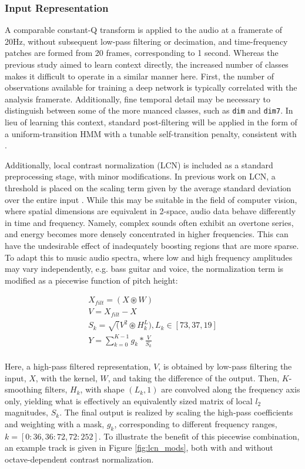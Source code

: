 \subsubsection{Input Representation}
\label{subsubsec:data_considerations}
A comparable constant-Q transform is applied to the audio at a framerate of 20Hz, without subsequent low-pass filtering or decimation, and time-frequency patches are formed from 20 frames, corresponding to 1 second.
Whereas the previous study aimed to learn context directly, the increased number of classes makes it difficult to operate in a similar manner here.
First, the number of observations available for training a deep network is typically correlated with the analysis framerate.
Additionally, fine temporal detail may be necessary to distinguish between some of the more nuanced classes, such as \texttt{dim} and \texttt{dim7}.
In lieu of learning this context, standard post-filtering will be applied in the form of a uniform-transition HMM with a tunable self-transition penalty, consistent with \cite{Cho2014Improved}. %

Additionally, local contrast normalization (LCN) is included as a standard preprocessing stage, with minor modifications.
In previous work on LCN, a threshold is placed on the scaling term given by the average standard deviation over the entire input \cite{Kavukcuoglu2010Learning}.
While this may be suitable in the field of computer vision, where spatial dimensions are equivalent in 2-space, audio data behave differently in time and frequency.
Namely, complex sounds often exhibit an overtone series, and energy becomes more densely concentrated in higher frequencies.
This can have the undesirable effect of inadequately boosting regions that are more sparse.
To adapt this to music audio spectra, where low and high frequency amplitudes may vary independently, e.g. bass guitar and voice, the normalization term is modified as a piecewise function of pitch height:

\begin{align*}
X_{filt} = (X \circledast W) \\
V = X_{filt} - X \\
S_k = \sqrt(V^2 \circledast H_k^L), L_k \in [73, 37, 19] \\
Y = \sum_{k=0}^{K-1} g_k * \frac{V}{S_k} \\
\end{align*}

\noindent Here, a high-pass filtered representation, $V$, is obtained by low-pass filtering the input, $X$, with the kernel, $W$, and taking the difference of the output.
Then, $K$-smoothing filters, $H_k$, with shape $(L_k, 1)$ are convolved along the frequency axis only, yielding what is effectively an equivalently sized matrix of local $l_2$ magnitudes, $S_k$.
The final output is realized by scaling the high-pass coefficients and weighting with a mask, $g_k$, corresponding to different frequency ranges, $k=[0:36, 36:72, 72:252]$.
To illustrate the benefit of this piecewise combination, an example track is given in Figure \ref{fig:lcn_mods}, both with and without octave-dependent contrast normalization.

